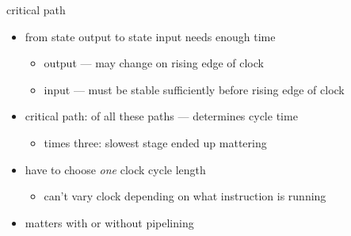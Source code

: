 \begin{frame}{critical path}
    \begin{itemize}
        \item {} from state output to state input needs enough time
            \begin{itemize}
            \item output --- may change on rising edge of clock
            \item input --- must be stable sufficiently before rising edge of clock
            \end{itemize}
        \item critical path:  of all these paths --- determines cycle time
            \begin{itemize}
            \item times three: slowest stage ended up mattering
            \end{itemize}
        \item have to choose \textit{one} clock cycle length
            \begin{itemize}
            \item can't vary clock depending on what instruction is running
            \end{itemize}
        \vspace{.5cm}
        \item matters with or without pipelining
    \end{itemize}
\end{frame}

